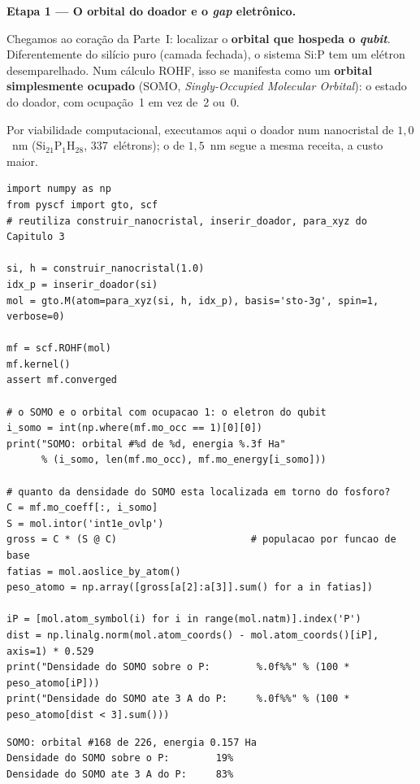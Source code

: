 \documentclass[11pt,a4paper,openany]{book}
\newcommand{\qubit}{\emph{qubit}}
\begin{document}
\begin{caixaancora}
\textbf{Etapa 1 --- O orbital do doador e o \emph{gap} eletrônico.}

Chegamos ao coração da Parte~I: localizar o \textbf{orbital que hospeda o
\qubit{}}. Diferentemente do silício puro (camada fechada), o sistema Si:P tem um
elétron desemparelhado. Num cálculo ROHF, isso se manifesta como um
\textbf{orbital simplesmente ocupado} (SOMO, \emph{Singly-Occupied Molecular
Orbital}): o estado do doador, com ocupação~1 em vez de~2 ou~0.

\vspace{0.2cm}
Por viabilidade computacional, executamos aqui o doador num nanocristal de
$1{,}0$~nm (Si$_{21}$P$_1$H$_{28}$, 337~elétrons); o de $1{,}5$~nm segue a mesma
receita, a custo maior.

\begin{lstlisting}[style=python]
import numpy as np
from pyscf import gto, scf
# reutiliza construir_nanocristal, inserir_doador, para_xyz do Capitulo 3

si, h = construir_nanocristal(1.0)
idx_p = inserir_doador(si)
mol = gto.M(atom=para_xyz(si, h, idx_p), basis='sto-3g', spin=1, verbose=0)

mf = scf.ROHF(mol)
mf.kernel()
assert mf.converged

# o SOMO e o orbital com ocupacao 1: o eletron do qubit
i_somo = int(np.where(mf.mo_occ == 1)[0][0])
print("SOMO: orbital #%d de %d, energia %.3f Ha"
      % (i_somo, len(mf.mo_occ), mf.mo_energy[i_somo]))

# quanto da densidade do SOMO esta localizada em torno do fosforo?
C = mf.mo_coeff[:, i_somo]
S = mol.intor('int1e_ovlp')
gross = C * (S @ C)                       # populacao por funcao de base
fatias = mol.aoslice_by_atom()
peso_atomo = np.array([gross[a[2]:a[3]].sum() for a in fatias])

iP = [mol.atom_symbol(i) for i in range(mol.natm)].index('P')
dist = np.linalg.norm(mol.atom_coords() - mol.atom_coords()[iP], axis=1) * 0.529
print("Densidade do SOMO sobre o P:        %.0f%%" % (100 * peso_atomo[iP]))
print("Densidade do SOMO ate 3 A do P:     %.0f%%" % (100 * peso_atomo[dist < 3].sum()))
\end{lstlisting}

\begin{lstlisting}[style=console]
SOMO: orbital #168 de 226, energia 0.157 Ha
Densidade do SOMO sobre o P:        19%
Densidade do SOMO ate 3 A do P:     83%
\end{lstlisting}


\end{caixaancora}
\end{document}
